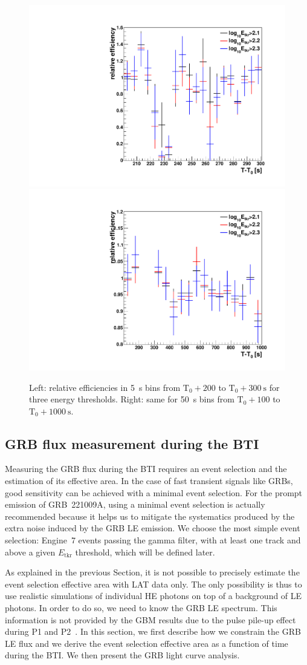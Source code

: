 \documentclass[preprint]{aastex631}
\begin{document}
\begin{figure}[t]
    \centering    
    \includegraphics[width=0.45\linewidth]{paper_companalimbtemplateBTI_20_200p6_300p6.pdf}
    \includegraphics[width=0.45\linewidth]{paper_companalimbtemplateBTI_18_100p6_1000p6.pdf}
    \caption{Left: relative efficiencies in 5~s bins from $\mathrm{T}_0+200$ to $\mathrm{T}_0+300~\mathrm{s}$ for three energy thresholds.  Right: same for 50~s bins from $\mathrm{T}_0+100$ to $\mathrm{T}_0+1000~\mathrm{s}$.}
    \label{fig:trigger_filter_efficiency_comp}
\end{figure}

\subsection{GRB flux measurement during the BTI}

Measuring the GRB flux during the BTI requires an event selection and the estimation of its effective area. In the case of fast transient signals like GRBs, good sensitivity can be achieved with a minimal event selection. For the prompt emission of GRB~221009A, using a minimal event selection is actually recommended because it helps us to mitigate the systematics produced by the extra noise induced by the GRB LE emission. We choose the most simple event selection: Engine~7 events passing the gamma filter, with at least one track and above a given $E_\mathrm{tkr}$ threshold, which will be defined later.

As explained in the previous Section, it is not possible to precisely estimate the event selection effective area with LAT data only. The only possibility is thus to use realistic simulations of individual HE photons on top of a background of LE photons. In order to do so, we need to know the GRB LE spectrum. This information is not provided by the GBM results due to the pulse pile-up effect during P1 and P2~\citep{2023ApJ...952L..42L}. In this section, we first describe how we constrain the GRB LE flux and we derive the event selection effective area as a function of time during the BTI. We then present the GRB light curve analysis. 
\end{document}

